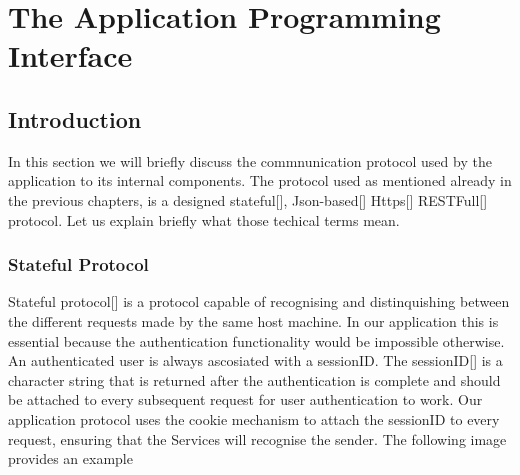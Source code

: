 \chapter{The Application Programming Interface}
\label{API}
	\section{Introduction}
		In this section we will briefly discuss the commnunication protocol used by the application to its internal components. The protocol used as mentioned
		already in the previous chapters, is a designed stateful[\cite{session-rfc6265}], Json-based[\cite{json-rfc7159}] Https[\cite{rfc2818}] RESTFull[\cite{restful-rfc7231}]
		protocol. Let us explain briefly what those techical terms mean.
		\subsection{Stateful Protocol}
			Stateful protocol[\cite{session-rfc6265}] is a protocol capable of recognising and distinquishing between the different requests made by the same host machine. 
			In our application this is essential because the authentication functionality would be impossible otherwise. An authenticated user is 
			always ascosiated with a sessionID. The sessionID[\cite{sessionID-rfc7329}] is a character string that is returned after the authentication is 
			complete and should be attached to every subsequent request for user authentication to work. Our application protocol uses the cookie mechanism
			to attach the sessionID to every request, ensuring that the Services will recognise the sender. The following image provides an example
